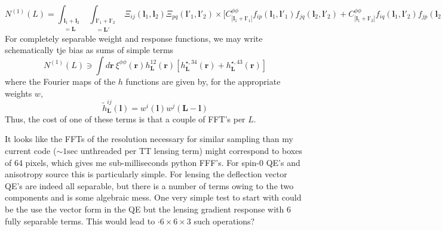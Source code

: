 \documentclass[11pt]{article}
\begin{document}
\newcommand{\bl}{\boldsymbol{l}}
\newcommand{\br}{\boldsymbol{r}}

\newcommand{\bll}{\boldsymbol{L}}
\newcommand{\intL}{\int_{\substack{\bl_1 + \bl_2 \\ =\bll }}}
\newcommand{\intLp}{\int_{\substack{\bl'_1 + \bl'_2 \\ =\bll' }}}

\begin{equation}
N^{(1)}(L) = \intL \intLp \Xi_{ij}(\bl_1, \bl_2) \Xi_{pq}(\bl'_1, \bl'_2) \times \big[ C^{\phi \phi}_{|\bl_1+\bl'_1|}f_{ip}(\bl_1, \bl'_1) f_{jq}(\bl_2, \bl'_2) + C^{\phi \phi}_{|\bl_1+\bl'_2|}f_{iq}(\bl_1, \bl'_2) f_{jp}(\bl_2, \bl'_1) \big] \, ,
\end{equation}
For completely separable weight and response functions, we may write schematically tje bias as sums of simple terms
\begin{equation}
	N^{(1)}(L) \ni  \int d\br\: \xi^{\phi \phi}(\br) h^{12}_{\bll}(\br)\left[ h^{\star, 34}_{\bll}(\br) + h^{\star, 43}_{\bll}(\br)\right]
\end{equation}
where the Fourier maps of the $h$ functions are given by, for the appropriate weights $w$,
\begin{equation}
	\tilde h^{ij}_{\bll}(\bl) =  w^i(\bl) w^j(\bll - \bl)
\end{equation}
Thus, the cost of one of these terms is that a couple of FFT's per $L$.

It looks like the FFTs of the resolution necessary for similar sampling than my current code ($\sim 1 $sec unthreaded per TT lensing term) might correspond to boxes of 64 pixels, which gives me sub-milliseconds python FFF's. 
For spin-0 QE's and anisotropy source this is particularly simple. For lensing the deflection vector QE's are indeed all separable, but there is a number of terms owing to the two components and is some algebraic mess. One very simple test to start with could be the use the vector form in the QE but the lensing gradient response with 6 fully separable terms. This would lead to $\cdot 6 \times 6 \times 3$ such operations?
\end{document}
